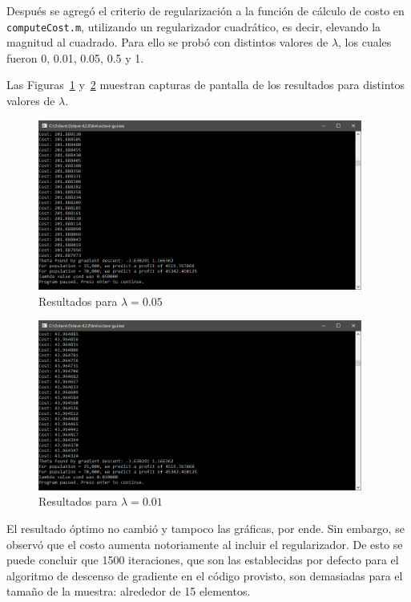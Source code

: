 \documentclass{llncs}
\begin{document}
Después se agregó el criterio de regularización a la función de cálculo de costo en \texttt{computeCost.m},
utilizando un regularizador cuadrático, es decir, elevando la magnitud al cuadrado.
Para ello se probó con distintos valores de $\lambda$,
los cuales fueron 0, 0.01, 0.05, 0.5 y 1.

Las Figuras~\ref{fig:lambda005} y~\ref{fig:lambda001} muestran capturas de pantalla de los resultados para distintos valores de $\lambda$.

\begin{figure}[h]
	\centering
	\includegraphics[width=0.95\textwidth]{03-lambda0dot05}
	\caption{Resultados para $\lambda=0.05$}
	\label{fig:lambda005}
\end{figure}

\begin{figure}[h!]
	\centering
	\includegraphics[width=0.95\textwidth]{03-lambda0dot01}
	\caption{Resultados para $\lambda=0.01$}
	\label{fig:lambda001}
\end{figure}

El resultado óptimo no cambió y tampoco las gráficas, por ende.
Sin embargo, se observó que el costo aumenta notoriamente al incluir el regularizador.
De esto se puede concluir que 1500 iteraciones,
que son las establecidas por defecto para el algoritmo de descenso de gradiente en el código provisto,
son demasiadas para el tamaño de la muestra: alrededor de 15 elementos.
\end{document}
